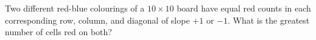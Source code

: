 Two different red-blue colourings of a $10\times10$ board have equal red counts in each corresponding row, column, and diagonal of slope $+1$ or $-1$. What is the greatest number of cells red on both?
